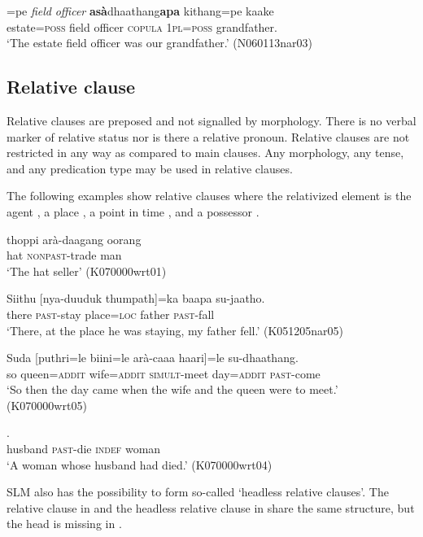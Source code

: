 \ea
{}=pe {\em field} {\em officer} \textbf{asà}dhaathang\textbf{apa}  kithang=pe     kaake\\
     estate=\textsc{poss} field officer \textsc{copula} 1\textsc{pl}=\textsc{poss} grandfather. \\
    `The estate field officer was our grandfather.' (N060113nar03)
\z

\subsection{Relative clause}
Relative clauses are preposed and not signalled by morphology. There is no verbal marker of relative status nor is there a relative pronoun. Relative clauses are not restricted in any way as compared to main clauses. Any morphology, any tense, and any predication type may be used in relative clauses. 

The following examples show relative clauses where the relativized element is
the agent ,
a place ,
a point in time , and
a possessor .

\ea\label{ex:relc:ag}
\gll thoppi arà-daagang    oorang \\
     hat \textsc{nonpast}-trade man  \\
    `The hat seller' (K070000wrt01)
\z


\ea\label{ex:relc:loc}
   \gll Siithu [nya-duuduk    thumpath]=ka baapa  su-jaatho. \\ %
     there \textsc{past}-stay place=\textsc{loc} father \textsc{past}-fall  \\
    `There, at the place he was staying, my father fell.' (K051205nar05)
\z

\ea\label{ex:relc:time}
\gll Suda [puthri=le biini=le arà-caa{\und}a haari]=le su-dhaathang. \\
      so queen=\textsc{addit} wife=\textsc{addit} \textsc{simult}-meet day=\textsc{addit} \textsc{past}-come \\
    `So then the day came when the wife and the queen were to meet.'  (K070000wrt05)
\z      

\ea\label{ex:relc:poss}
. \\ %
     husband \textsc{past}-die \textsc{indef} woman  \\
    `A woman whose husband had died.'  (K070000wrt04)
\z      


SLM also has the possibility to form so-called `headless relative clauses'. The relative clause in  and the headless relative clause in  share the same structure, but the head is missing in .
 

